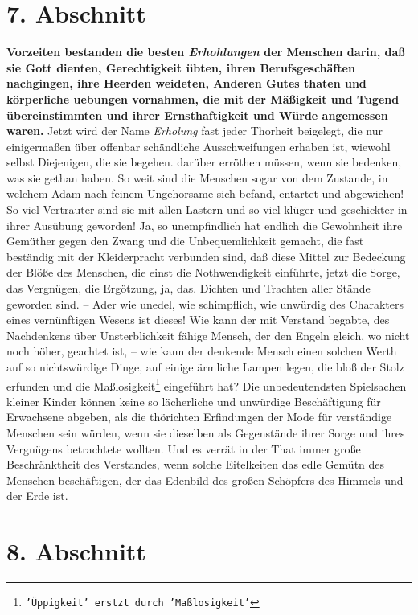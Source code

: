 \section{7. Abschnitt} \label{kap14_ab7}

 \textbf{Vorzeiten bestanden die besten \textit{Erhohlungen} der Menschen darin, daß sie Gott
dienten, Gerechtigkeit übten, ihren Berufsgeschäften nachgingen, ihre Heerden
weideten, Anderen Gutes thaten und körperliche uebungen vornahmen, die mit der
Mäßigkeit und Tugend übereinstimmten und ihrer Ernsthaftigkeit und Würde
angemessen waren.} Jetzt wird der Name \textit{Erholung} fast jeder Thorheit
beigelegt, die nur einigermaßen über offenbar schändliche Ausschweifungen
erhaben ist, wiewohl selbst Diejenigen, die sie begehen. darüber erröthen
müssen, wenn sie bedenken, was sie gethan haben. So weit sind die Menschen sogar
von dem Zustande, in welchem Adam nach feinem Ungehorsame sich befand, entartet
und abgewichen! So viel Vertrauter sind sie mit allen Lastern und so viel klüger
und geschickter in ihrer Ausübung geworden! Ja, so unempfindlich hat endlich die
Gewohnheit ihre Gemüther gegen den Zwang und die Unbequemlichkeit gemacht, die
fast beständig mit der Kleiderpracht verbunden sind, daß diese Mittel zur
Bedeckung der Blöße des Menschen, die einst die Nothwendigkeit einführte, jetzt
die Sorge, das Vergnügen, die Ergötzung, ja, das. Dichten und Trachten aller
Stände geworden sind. -- Ader wie unedel, wie schimpflich, wie unwürdig des
Charakters eines vernünftigen Wesens ist dieses! Wie kann der mit Verstand
begabte, des Nachdenkens über Unsterblichkeit fähige Mensch, der den Engeln
gleich, wo nicht noch höher, geachtet ist, -- wie kann der denkende Mensch einen
solchen Werth auf so nichtswürdige Dinge, auf einige ärmliche Lampen legen, die
bloß der Stolz erfunden und die Maßlosigkeit\footnote{\texttt{'Üppigkeit' erstzt durch 'Maßlosigkeit'}} eingeführt hat? Die unbedeutendsten
Spielsachen kleiner Kinder können keine so lächerliche und unwürdige
Beschäftigung für Erwachsene abgeben, als die thörichten Erfindungen der Mode
für verständige Menschen sein würden, wenn sie dieselben als Gegenstände ihrer
Sorge und ihres Vergnügens betrachtete wollten. Und es verrät in der That immer
große Beschränktheit des Verstandes, wenn solche Eitelkeiten das edle Gemütn des
Menschen beschäftigen, der das Edenbild des großen Schöpfers des Himmels und der
Erde ist.

\section{8. Abschnitt} \label{kap14_ab8}


